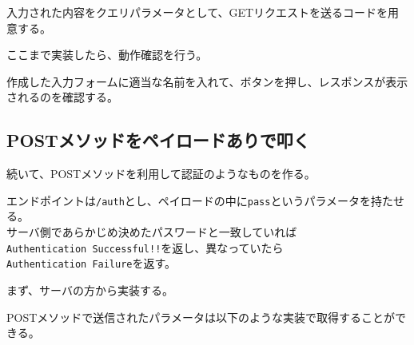 入力された内容をクエリパラメータとして、GETリクエストを送るコードを用意する。

\begin{Shaded}
\begin{Highlighting}[]
    \NormalTok{(}\NormalTok{)} \OperatorTok{=} \NormalTok{ () }\KeywordTok{=\textgreater{}}\NormalTok{ \{}
      \OperatorTok{=} \NormalTok{(}\NormalTok{)}\OperatorTok{;}
      \OperatorTok{=}  \NormalTok{(} \OperatorTok{+}\OperatorTok{;}
      \NormalTok{(}\NormalTok{)} \OperatorTok{=} \NormalTok{()}\OperatorTok{;}
\NormalTok{    \}}\OperatorTok{;}
\end{Highlighting}
\end{Shaded}

ここまで実装したら、動作確認を行う。

作成した入力フォームに適当な名前を入れて、ボタンを押し、レスポンスが表示されるのを確認する。

\subsection{POSTメソッドをペイロードありで叩く}\label{postux30e1ux30bdux30c3ux30c9ux3092ux30daux30a4ux30edux30fcux30c9ux3042ux308aux3067ux53e9ux304f}

続いて、POSTメソッドを利用して認証のようなものを作る。

エンドポイントは\texttt{/auth}とし、ペイロードの中に\texttt{pass}というパラメータを持たせる。\\
サーバ側であらかじめ決めたパスワードと一致していれば\texttt{Authentication\ Successful!!}を返し、異なっていたら\texttt{Authentication\ Failure}を返す。

まず、サーバの方から実装する。

POSTメソッドで送信されたパラメータは以下のような実装で取得することができる。

